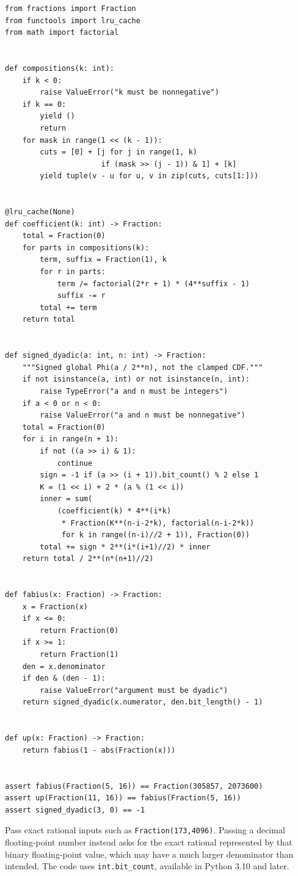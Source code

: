 \documentclass[11pt,a4paper]{article}
\theoremstyle{definition}
\theoremstyle{remark}
\begin{document}
\begin{lstlisting}
from fractions import Fraction
from functools import lru_cache
from math import factorial


def compositions(k: int):
    if k < 0:
        raise ValueError("k must be nonnegative")
    if k == 0:
        yield ()
        return
    for mask in range(1 << (k - 1)):
        cuts = [0] + [j for j in range(1, k)
                      if (mask >> (j - 1)) & 1] + [k]
        yield tuple(v - u for u, v in zip(cuts, cuts[1:]))


@lru_cache(None)
def coefficient(k: int) -> Fraction:
    total = Fraction(0)
    for parts in compositions(k):
        term, suffix = Fraction(1), k
        for r in parts:
            term /= factorial(2*r + 1) * (4**suffix - 1)
            suffix -= r
        total += term
    return total


def signed_dyadic(a: int, n: int) -> Fraction:
    """Signed global Phi(a / 2**n), not the clamped CDF."""
    if not isinstance(a, int) or not isinstance(n, int):
        raise TypeError("a and n must be integers")
    if a < 0 or n < 0:
        raise ValueError("a and n must be nonnegative")
    total = Fraction(0)
    for i in range(n + 1):
        if not ((a >> i) & 1):
            continue
        sign = -1 if (a >> (i + 1)).bit_count() % 2 else 1
        K = (1 << i) + 2 * (a % (1 << i))
        inner = sum(
            (coefficient(k) * 4**(i*k)
             * Fraction(K**(n-i-2*k), factorial(n-i-2*k))
             for k in range((n-i)//2 + 1)), Fraction(0))
        total += sign * 2**(i*(i+1)//2) * inner
    return total / 2**(n*(n+1)//2)


def fabius(x: Fraction) -> Fraction:
    x = Fraction(x)
    if x <= 0:
        return Fraction(0)
    if x >= 1:
        return Fraction(1)
    den = x.denominator
    if den & (den - 1):
        raise ValueError("argument must be dyadic")
    return signed_dyadic(x.numerator, den.bit_length() - 1)


def up(x: Fraction) -> Fraction:
    return fabius(1 - abs(Fraction(x)))


assert fabius(Fraction(5, 16)) == Fraction(305857, 2073600)
assert up(Fraction(11, 16)) == fabius(Fraction(5, 16))
assert signed_dyadic(3, 0) == -1
\end{lstlisting}
Pass exact rational inputs such as \texttt{Fraction(173,4096)}.  Passing a decimal
floating-point number instead asks for the exact rational represented by that
binary floating-point value, which may have a much larger denominator than
intended.  The code uses \texttt{int.bit\_count}, available in Python 3.10 and later.
\end{document}

